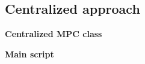 \subsection{Centralized approach}
\textbf{Centralized MPC class}

\vspace*{0.1cm}
\textbf{Main script}
